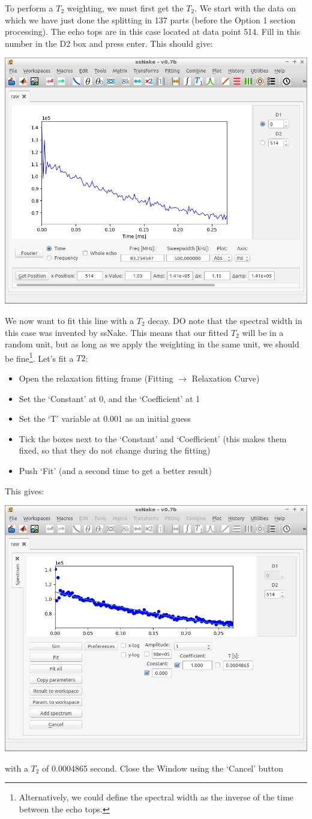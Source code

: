 \documentclass[11pt,a4paper]{article}
\begin{document}
To perform a $T_2$  weighting, we must first get the $T_2$. We start with the data on which we have
just done the splitting in 137 parts (before the Option 1 section processing). The echo tops are in
this case located at data point 514. Fill in this number in the D2 box and press enter. This should
give:
\begin{center}
\includegraphics[width=0.7\linewidth]{Figs/Fig7.png}
\end{center}

We now want to fit this line with a $T_2$ decay. DO note that the spectral width in this case was
invented by ssNake. This means that our fitted $T_2$ will be in a random unit, but as long as we
apply the weighting in the same unit, we should be fine\footnote{Alternatively, we could define the
spectral width as the inverse of the time between the echo tops.}. Let's fit a $T2$:

\begin{itemize}
  \item Open the relaxation fitting frame (Fitting $\longrightarrow$ Relaxation Curve)
	\item Set the `Constant' at 0, and the `Coefficient' at 1
	\item Set the `T' variable at 0.001 as an initial guess
	 \item Tick the boxes next to the `Constant' and `Coefficient' (this makes them fixed, so that they
		do not change during the fitting)
	\item Push `Fit' (and a second time to get a better result)
\end{itemize}
This gives:
\begin{center}
\includegraphics[width=0.7\linewidth]{Figs/Fig8.png}
\end{center}
with a $T_2$ of 0.0004865 second. Close the Window using the `Cancel' button
\end{document}
